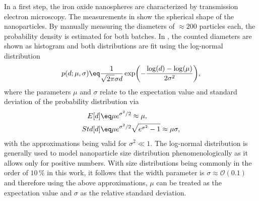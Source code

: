 \documentclass[\main/dresen_thesis.tex]{subfiles}
\begin{document}
  In a first step, the iron oxide nanospheres are characterized by transmission electron microscopy.
  The measurements in  show the spherical shape of the nanoparticles.
  By manually measuring the diameters of $\approx 200$ particles each, the probability density is estimated for both batches.
  In , the counted diameters are shown as histogram and both distributions are fit using the log-normal distribution
  \begin{align}\label{eq:looselyPackedNP:nanoparticle:lognormalDist}
    p(d; \mu, \sigma) \eq \frac{1}{\sqrt{2\pi} \sigma d} \exp \biggl( - \frac{\log(d) - \log(\mu)}{2 \sigma^2} \biggr),
  \end{align}
  where the parameters $\mu$ and $\sigma$ relate to the expectation value and standard deviation of the probability distribution via
  \begin{align}
    E[d] \eq& \mu e^{\sigma^2/2} \approx \mu,\\
    Std[d] \eq& \mu e^{\sigma^2/2} \sqrt{e^{\sigma^2} - 1} \approx \mu \sigma,\\
  \end{align}
  with the approximations being valid for $\sigma^2 \ll 1$.
  The log-normal distribution is generally used to model nanoparticle size distribution phenomenologically as it allows only for positive numbers.
  With size distributions being commonly in the order of $10 \, \%$ in this work, it follows that the width parameter is $\sigma \approx \mathcal{O}(0.1)$ and therefore using the above approximations, $\mu$ can be treated as the expectation value and $\sigma$ as the relative standard deviation.
\end{document}
